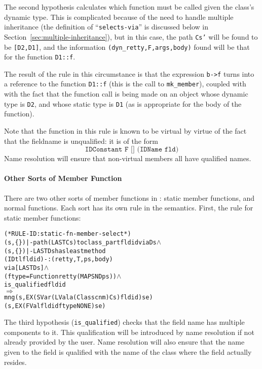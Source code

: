 \documentclass[11pt]{article}
\newcommand{\lbr}{\texttt{\{}}
\newcommand{\rbr}{\texttt{\}}}
\begin{document}
The second hypothesis calculates which function must be called given
the class's dynamic type.  This is complicated because of the need to
handle multiple inheritance (the definition of
``\texttt{selects-via}'' is discussed below in
Section~\ref{sec:multiple-inheritance}), but in this case, the path
\texttt{Cs'} will be found to be \texttt{[D2,D1]}, and the information
\texttt{(dyn_retty,F,args,body)} found will be that for the function
\texttt{D1::f}.

The result of the rule in this circumstance is that the expression
\texttt{b->f} turns into a reference to the function \texttt{D1::f}
(this is the call to \texttt{mk_member}), coupled with with the fact
that the function call is being made on an object whose dynamic type
is \texttt{D2}, and whose static type is \texttt{D1} (as is
appropriate for the body of the function).

Note that the function in this rule is known to be virtual by virtue
of the fact that the fieldname is unqualified: it is of the form
\[
\texttt{IDConstant~F~[]~(IDName~fld)}
\]
Name resolution will ensure that non-virtual members all have
qualified names.

\paragraph{Other Sorts of Member Function}

There are two other sorts of member functions in \cpp{}: static
member functions, and normal functions.  Each sort has its own rule
in the semantics.
First, the rule for static member functions:
\begin{center}
\begin{minipage}{\textwidth}
%
\begin{alltt}
(* RULE-ID: static-fn-member-select *)
     (s,\lbr\rbr) |- path (LAST Cs) to class_part fldid via Ds \(\land\)
     (s,\lbr\rbr) |- LAST Ds has least method
                  (IDtl fldid) -: (retty,T,ps,body)
                  via [LAST Ds] \(\land\)
     (ftype = Function retty (MAP SND ps)) \(\land\)
     is_qualified fldid
   \(\Rightarrow\)
     mng (s, EX (SVar (LVal a (Class cnm) Cs) fldid) se)
         (s, EX (FVal fldid ftype NONE) se)
\end{alltt}
\end{minipage}
\end{center}
%
The third hypothesis (\texttt{is_qualified}) checks that the field
name has multiple components to it.  This qualification will be
introduced by name resolution if not already provided by the user.
Name resolution will also ensure that the name given to the field is
qualified with the name of the class where the field actually
resides.
\end{document}
